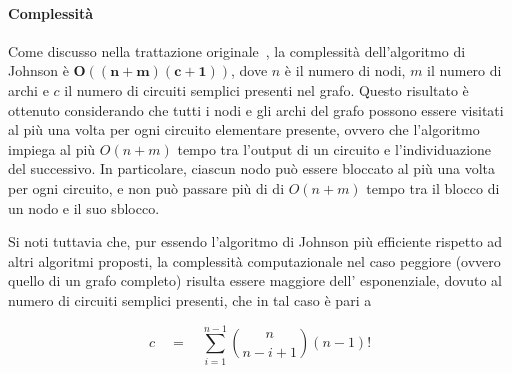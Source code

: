 \paragraph{Complessit\`a}
Come discusso nella trattazione originale~\cite{doi:10.1137/0204007}, la complessit\`a dell'algoritmo di Johnson
\`e $\mathbf{O((n + m)(c + 1))}$, dove $n$ \`e il numero di nodi, $m$ il numero di archi e $c$ il numero di circuiti semplici
presenti nel grafo.
Questo risultato \`e ottenuto considerando che tutti i nodi e gli archi del grafo possono essere visitati al pi\`u una
volta per ogni circuito elementare presente, ovvero che l'algoritmo impiega al pi\`u $O(n + m)$ tempo tra l'output di
un circuito e l'individuazione del successivo.
In particolare, ciascun nodo pu\`o essere bloccato al pi\`u una volta per ogni circuito, e non pu\`o passare pi\`u di
di $O(n + m)$ tempo tra il blocco di un nodo e il suo sblocco. \newline

Si noti tuttavia che, pur essendo l'algoritmo di Johnson pi\`u efficiente rispetto ad altri algoritmi proposti, la
complessit\`a computazionale nel caso peggiore (ovvero quello di un grafo completo) risulta essere maggiore dell'
esponenziale, dovuto al numero di circuiti semplici presenti, che in tal caso \`e pari a

\begin{equation*}
    c \quad = \quad \sum_{i = 1}^{n-1} \binom{n}{n-i+1} (n-1)!
\end{equation*}


